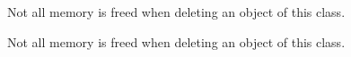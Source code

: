 
\begin{DoxyRefList}
\item[\label{bug__bug000001}%
\hypertarget{bug__bug000001}{}%
Class \hyperlink{classdiffusionfluxinterface}{diffusionfluxinterface} ]Not all memory is freed when deleting an object of this class.  
\item[\label{bug__bug000002}%
\hypertarget{bug__bug000002}{}%
Class \hyperlink{classnetfluxinterface}{netfluxinterface} ]Not all memory is freed when deleting an object of this class. 
\end{DoxyRefList}